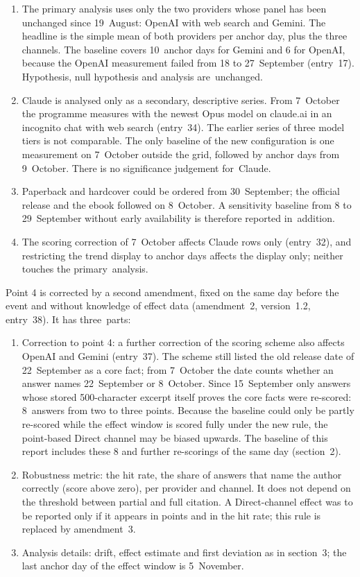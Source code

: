 \documentclass[11pt]{article}
\providecommand{\tightlist}{\setlength{\itemsep}{0pt}\setlength{\parskip}{0pt}}
\begin{document}
\begin{enumerate}
\def\labelenumi{\arabic{enumi}.}
\tightlist
\item
  The primary analysis uses only the two providers whose panel has been unchanged since 19~August: OpenAI with web search and Gemini. The headline is the simple mean of both providers per anchor day, plus the three channels. The baseline covers 10~anchor days for Gemini and 6 for OpenAI, because the OpenAI measurement failed from 18 to 27~September (entry~17). Hypothesis, null hypothesis and analysis are~\mbox{unchanged.}
\item
  Claude is analysed only as a secondary, descriptive series. From 7~October the programme measures with the newest Opus model on claude.ai in an incognito chat with web search (entry~34). The earlier series of three model tiers is not comparable. The only baseline of the new configuration is one measurement on 7~October outside the grid, followed by anchor days from 9~October. There is no significance judgement for~\mbox{Claude.}
\item
  Paperback and hardcover could be ordered from 30~September; the official release and the ebook followed on 8~October. A sensitivity baseline from 8 to 29~September without early availability is therefore reported in~\mbox{addition.}
\item
  The scoring correction of 7~October affects Claude rows only (entry~32), and restricting the trend display to anchor days affects the display only; neither touches the primary~\mbox{analysis.}
\end{enumerate}

Point 4 is corrected by a second amendment, fixed on the same day before the event and without knowledge of effect data (amendment~2, version~1.2, entry~38). It has three~\mbox{parts:}

\begin{enumerate}
\def\labelenumi{\arabic{enumi}.}
\tightlist
\item
  Correction to point 4: a further correction of the scoring scheme also affects OpenAI and Gemini (entry~37). The scheme still listed the old release date of 22~September as a core fact; from 7~October the date counts whether an answer names 22~September or 8~October. Since 15~September only answers whose stored 500-character excerpt itself proves the core facts were re-scored: 8~answers from two to three points. Because the baseline could only be partly re-scored while the effect window is scored fully under the new rule, the point-based Direct channel may be biased upwards. The baseline of this report includes these 8 and further re-scorings of the same day (section~2).
\item
  Robustness metric: the hit rate, the share of answers that name the author correctly (score above zero), per provider and channel. It does not depend on the threshold between partial and full citation. A Direct-channel effect was to be reported only if it appears in points and in the hit rate; this rule is replaced by amendment~3.
\item
  Analysis details: drift, effect estimate and first deviation as in section~3; the last anchor day of the effect window is 5~November.
\end{enumerate}
\end{document}
